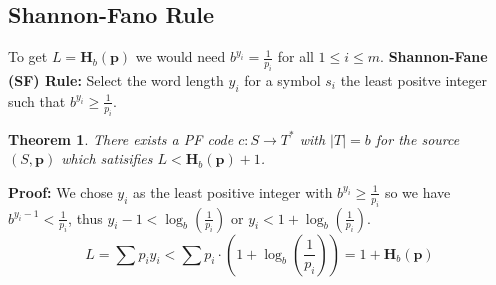 \documentclass[11pt]{article}
\newtheorem{theo}{Theorem}
\begin{document}
\subsection{Shannon-Fano Rule}
To get $L = \textbf{H}_b(\textbf{p})$ we would need $b^{y_i} = \frac{1}{p_i}$ for all $1 \leq i \leq m$.
\textbf{Shannon-Fane (SF) Rule:}
Select the word length $y_i$ for a symbol $s_i$ the least positve integer such that $b^{y_i} \geq \frac{1}{p_i}$.
\begin{theo}
  There exists a PF code $c : S \rightarrow T^*$ with $\lvert T \rvert = b$ for the source $(S, \textbf{p})$ which satisifies $L < \textbf{H}_b(\textbf{p}) + 1$.
\end{theo}

\textbf{Proof:}
We chose $y_i$ as the least positive integer with $b^{y_i} \geq \frac{1}{p_i}$ so we have $b^{y_i - 1} < \frac{1}{p_i}$, thus $y_i - 1 < \log_b(\frac{1}{p_i})$ or $y_i < 1 + \log_b(\frac{1}{p_i})$.
\[
  L = \sum p_iy_i < \sum p_i \cdot (1 + \log_b(\frac{1}{p_i})) = 1 + \textbf{H}_b(\textbf{p})
\]
\end{document}
